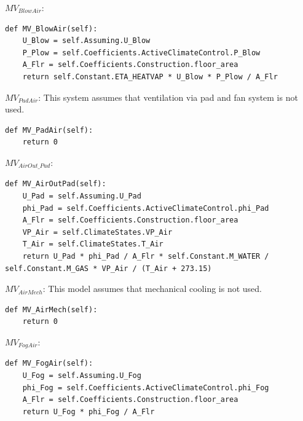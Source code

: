 \documentclass[a4paper]{article}
\begin{document}
\(MV_{BlowAir}\):
\begin{mdframed}[leftline=false,rightline=false,backgroundcolor=magenta!10,nobreak=true]
  \begin{verbatim}
def MV_BlowAir(self):
    U_Blow = self.Assuming.U_Blow
    P_Plow = self.Coefficients.ActiveClimateControl.P_Blow
    A_Flr = self.Coefficients.Construction.floor_area
    return self.Constant.ETA_HEATVAP * U_Blow * P_Plow / A_Flr
  \end{verbatim}
\end{mdframed}

\(MV_{PadAir}\):
This system assumes that ventilation via pad and fan system is not used.
\begin{mdframed}[leftline=false,rightline=false,backgroundcolor=magenta!10,nobreak=true]
  \begin{verbatim}
def MV_PadAir(self):
    return 0
  \end{verbatim}
\end{mdframed}

\(MV_{AirOut\_Pad}\):
\begin{mdframed}[leftline=false,rightline=false,backgroundcolor=magenta!10,nobreak=true]
  \begin{verbatim}
def MV_AirOutPad(self):
    U_Pad = self.Assuming.U_Pad
    phi_Pad = self.Coefficients.ActiveClimateControl.phi_Pad
    A_Flr = self.Coefficients.Construction.floor_area
    VP_Air = self.ClimateStates.VP_Air
    T_Air = self.ClimateStates.T_Air
    return U_Pad * phi_Pad / A_Flr * self.Constant.M_WATER / self.Constant.M_GAS * VP_Air / (T_Air + 273.15)
  \end{verbatim}
\end{mdframed}

\(MV_{AirMech}\):
This model assumes that mechanical cooling is not used.
\begin{mdframed}[leftline=false,rightline=false,backgroundcolor=magenta!10,nobreak=true]
  \begin{verbatim}
def MV_AirMech(self):
    return 0
  \end{verbatim}
\end{mdframed}

\(MV_{FogAir}\):
\begin{mdframed}[leftline=false,rightline=false,backgroundcolor=magenta!10,nobreak=true]
  \begin{verbatim}
def MV_FogAir(self):
    U_Fog = self.Assuming.U_Fog
    phi_Fog = self.Coefficients.ActiveClimateControl.phi_Fog
    A_Flr = self.Coefficients.Construction.floor_area
    return U_Fog * phi_Fog / A_Flr
  \end{verbatim}
\end{mdframed}
\end{document}
